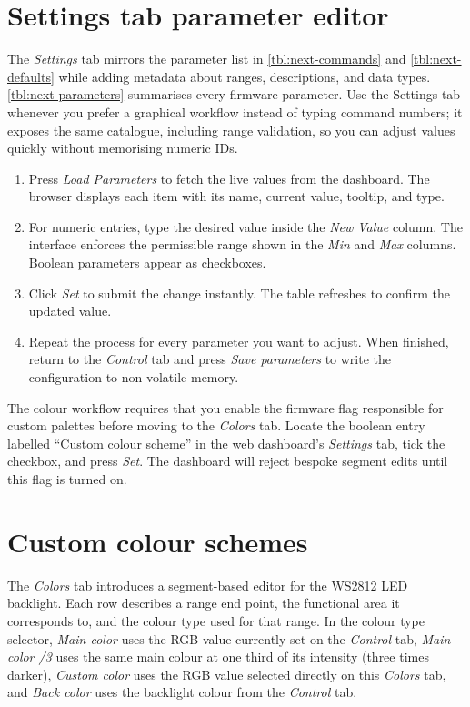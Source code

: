 \section{Settings tab parameter editor}
The \emph{Settings} tab mirrors the parameter list in \autoref{tbl:next-commands} and \autoref{tbl:next-defaults} while adding metadata about ranges, descriptions, and data types.\@{}\autoref{tbl:next-parameters} summarises every firmware parameter.
Use the Settings tab whenever you prefer a graphical workflow instead of typing command numbers; it exposes the same catalogue, including range validation, so you can adjust values quickly without memorising numeric IDs.

\begin{enumerate}
    \item Press \emph{Load Parameters} to fetch the live values from the dashboard. The browser displays each item with its name, current value, tooltip, and type.
    \item For numeric entries, type the desired value inside the \emph{New Value} column. The interface enforces the permissible range shown in the \emph{Min} and \emph{Max} columns. Boolean parameters appear as checkboxes.
    \item Click \emph{Set} to submit the change instantly. The table refreshes to confirm the updated value.
    \item Repeat the process for every parameter you want to adjust. When finished, return to the \emph{Control} tab and press \emph{Save parameters} to write the configuration to non-volatile memory.
\end{enumerate}

The colour workflow requires that you enable the firmware flag responsible for custom palettes before moving to the \emph{Colors} tab.
Locate the boolean entry labelled ``Custom colour scheme'' in the web dashboard's \emph{Settings} tab, tick the checkbox, and press \emph{Set}. The dashboard will reject bespoke segment edits until this flag is turned on.

\section{Custom colour schemes}
The \emph{Colors} tab introduces a segment-based editor for the WS2812 LED backlight. Each row describes a range end point, the functional area it corresponds to, and the colour type used for that range. In the colour type selector, \emph{Main color} uses the RGB value currently set on the \emph{Control} tab, \emph{Main color /3} uses the same main colour at one third of its intensity (three times darker), \emph{Custom color} uses the RGB value selected directly on this \emph{Colors} tab, and \emph{Back color} uses the backlight colour from the \emph{Control} tab.

